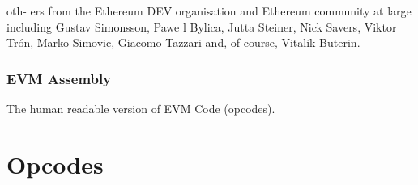 \documentclass[10pt,a4paper,leqno,bibliography=totoc]{scrartcl}
\newenvironment{alphafootnotes}
{\par\edef\savedfootnotenumber{\number\value{footnote}}
\renewcommand{\thefootnote}{\alph{footnote}}
\setcounter{footnote}{0}}
{\par\setcounter{footnote}{\savedfootnotenumber}}
\begin{document}
\begin{alphafootnotes}
\begin{multicols*}{2}
oth- ers from the Ethereum DEV organisation and Ethereum community at large including Gustav Simonsson, Pawe l Bylica, Jutta Steiner, Nick Savers, Viktor Trón, Marko Simovic, Giacomo Tazzari and, of course, Vitalik Buterin.
		
			\subsubsection{EVM Assembly}
		The human readable version of EVM Code (opcodes).   \\


	\end{multicols*}

	\appendix

	\section{Opcodes}


\end{alphafootnotes}
\end{document}
